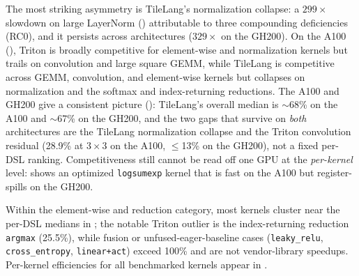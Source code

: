 The most striking asymmetry is TileLang's normalization collapse:
a $299\times$ slowdown on large LayerNorm () attributable to three compounding deficiencies (RC0), and it persists across architectures ($329\times$ on the GH200).
On the A100 (), Triton is broadly competitive for element-wise and normalization kernels but trails on convolution and large square GEMM, while TileLang is competitive across GEMM, convolution, and element-wise kernels but collapses on normalization and the softmax and index-returning reductions.
The A100 and GH200 give a consistent picture (): TileLang's overall median is $\sim$68\% on the A100 and $\sim$67\% on the GH200, and the two gaps that survive on \emph{both} architectures are the TileLang normalization collapse and the Triton convolution residual (28.9\% at $3\times3$ on the A100, $\le$13\% on the GH200), not a fixed per-DSL ranking. Competitiveness still cannot be read off one GPU at the \emph{per-kernel} level:  shows an optimized \texttt{logsumexp} kernel that is fast on the A100 but register-spills on the GH200.

Within the element-wise and reduction category, most kernels cluster near the per-DSL medians in ; the notable Triton outlier is the index-returning reduction \texttt{argmax} (25.5\%), while fusion or unfused-eager-baseline cases (\texttt{leaky\_relu}, \texttt{cross\_entropy}, \texttt{linear+act}) exceed 100\% and are not vendor-library speedups.
Per-kernel efficiencies for all benchmarked kernels appear in .
